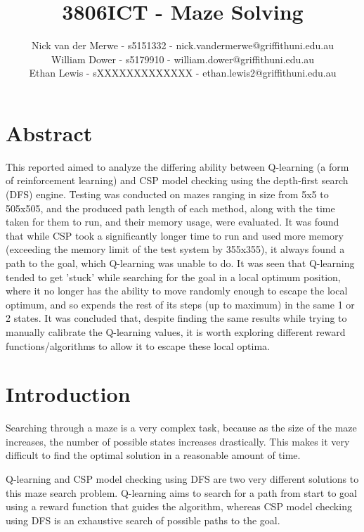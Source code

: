 \documentclass{article}
\title{3806ICT - Maze Solving}
\author{Nick van der Merwe - s5151332 - nick.vandermerwe@griffithuni.edu.au \\
    William Dower - s5179910 - william.dower@griffithuni.edu.au \\
    Ethan Lewis - sXXXXXXXXXXXXX - ethan.lewis2@griffithuni.edu.au}
\begin{document}
    \maketitle


    \section{Abstract}\label{sec:abstract}
        This reported aimed to analyze the differing ability between Q-learning (a form of reinforcement learning) and
        CSP model checking using the depth-first search (DFS) engine. Testing was conducted on mazes ranging in size
        from 5x5 to 505x505, and the produced path length of each method, along with the time taken for them to run, and
        their memory usage, were evaluated. It was found that while CSP took a significantly longer time to run and used
        more memory (exceeding the memory limit of the test system by 355x355), it always found a path to the goal, which
        Q-learning was unable to do. It was seen that Q-learning tended to get 'stuck' while searching for the goal in a
        local optimum position, where it no longer has the ability to move randomly enough to escape the local optimum,
        and so expends the rest of its steps (up to maximum) in the same 1 or 2 states. It was concluded that, despite
        finding the same results while trying to manually calibrate the Q-learning values, it is worth exploring different
        reward functions/algorithms to allow it to escape these local optima.

    \section{Introduction}\label{sec:introduction}
        Searching through a maze is a very complex task, because as the size of the maze increases, the number of
        possible states increases drastically. This makes it very difficult to find the optimal solution in a reasonable
        amount of time.

        Q-learning and CSP model checking using DFS are two very different solutions to this maze search problem.
        Q-learning aims to search for a path from start to goal using a reward function that guides the algorithm,
        whereas CSP model checking using DFS is an exhaustive search of possible paths to the goal.
\end{document}
